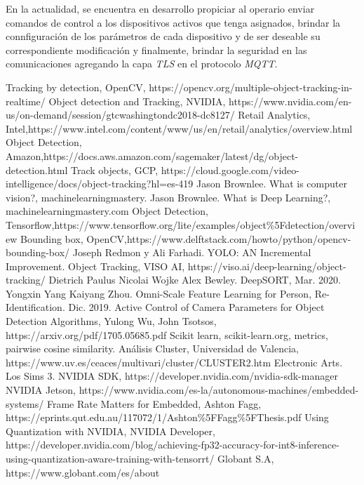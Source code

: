 \documentclass[a4paper]{IEEEtran}
\begin{document}
En la actualidad, se encuentra en desarrollo propiciar al operario enviar comandos de control a los dispositivos activos que tenga asignados, brindar la connfiguración de los parámetros de cada dispositivo y de ser deseable su correspondiente modificación y finalmente, brindar la seguridad en las comunicaciones agregando la capa \textit{TLS} en el protocolo \textit{MQTT}. 




\begin{thebibliography}{00}

 Tracking by detection, OpenCV, https://opencv.org/multiple-object-tracking-in-realtime/
 Object detection and Tracking, NVIDIA, https://www.nvidia.com/en-us/on-demand/session/gtcwashingtondc2018-dc8127/
 Retail Analytics, Intel,\newline https://www.intel.com/content/www/us/en/retail/analytics/overview.html
 Object Detection, Amazon,\newline https://docs.aws.amazon.com/sagemaker/latest/dg/object-detection.html
 Track objects, GCP, https://cloud.google.com/video-intelligence/docs/object-tracking?hl=es-419
 Jason Brownlee. What is computer vision?, machinelearningmastery.
 Jason Brownlee. What is Deep Learning?, machinelearningmastery.com
 Object Detection, Tensorflow,\newline https://www.tensorflow.org/lite/examples/object\%5Fdetection/overview
 Bounding box, OpenCV,https://www.delftstack.com/howto/python/opencv-bounding-box/
 Joseph Redmon y Ali Farhadi. YOLO: AN Incremental Improvement.
 Object Tracking, VISO AI, https://viso.ai/deep-learning/object-tracking/
 Dietrich Paulus Nicolai Wojke Alex Bewley. DeepSORT, Mar. 2020.
 Yongxin Yang Kaiyang Zhou. Omni-Scale Feature Learning for Person, Re-Identification. Dic. 2019.
 Active Control of Camera Parameters for Object Detection Algorithms, Yulong Wu, John Tsotsos, https://arxiv.org/pdf/1705.05685.pdf
 Scikit learn, scikit-learn.org, metrics, pairwise cosine similarity.
 Análisis Cluster, Universidad de Valencia, https://www.uv.es/ceaces/multivari/cluster/CLUSTER2.htm
 Electronic Arts. Los Sims 3.
 NVIDIA SDK, https://developer.nvidia.com/nvidia-sdk-manager
 NVIDIA Jetson, https://www.nvidia.com/es-la/autonomous-machines/embedded-systems/
 Frame Rate Matters for Embedded, Ashton Fagg, https://eprints.qut.edu.au/117072/1/Ashton\%5FFagg\%5FThesis.pdf
 Using Quantization with NVIDIA, NVIDIA Developer, https://developer.nvidia.com/blog/achieving-fp32-accuracy-for-int8-inference-using-quantization-aware-training-with-tensorrt/
 Globant S.A, https://www.globant.com/es/about

\end{thebibliography}
\end{document}
